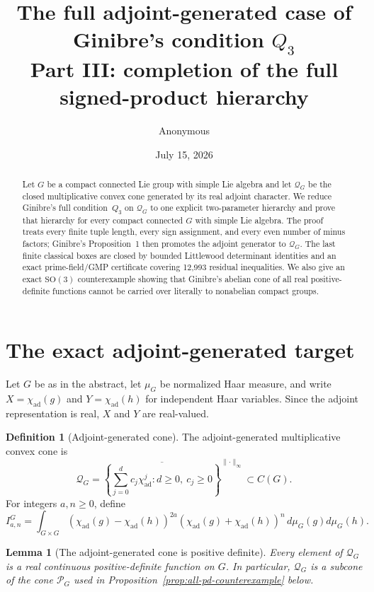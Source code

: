\documentclass[11pt,reqno]{amsart}
\title[Full adjoint-generated Ginibre $Q_3$]{The full adjoint-generated case of Ginibre's condition \texorpdfstring{$Q_3$}{Q3}\\
\large Part III: completion of the full signed-product hierarchy}
\author{Anonymous}
\date{July 15, 2026}
\theoremstyle{plain}
\newtheorem{lemma}[theorem]{Lemma}
\theoremstyle{definition}
\newtheorem{definition}[theorem]{Definition}
\newcommand{\chiad}{\chi_{\mathrm{ad}}}
\newcommand{\Qcone}{\mathcal Q}
\begin{document}
\begin{abstract}
Let $G$ be a compact connected Lie group with simple Lie algebra and let
$\Qcone_G$ be the closed multiplicative convex cone generated by its real
adjoint character.  We reduce Ginibre's full condition~$Q_3$ on $\Qcone_G$
to one explicit two-parameter hierarchy and prove that hierarchy for every
compact connected $G$ with simple Lie algebra.  The proof treats every finite
tuple length, every sign assignment, and every even number of minus factors;
Ginibre's Proposition~1 then promotes the adjoint generator to $\Qcone_G$.
The last finite classical boxes are closed by bounded Littlewood determinant
identities and an exact prime-field/GMP certificate covering 12,993 residual
inequalities.  We also give an exact $\mathrm{SO}(3)$ counterexample showing
that Ginibre's abelian cone of all real positive-definite functions cannot be
carried over literally to nonabelian compact groups.
\end{abstract}

\maketitle

\section{The exact adjoint-generated target}

Let $G$ be as in the abstract, let $\mu_G$ be normalized Haar measure, and
write $X=\chiad(g)$ and $Y=\chiad(h)$ for independent Haar variables.  Since
the adjoint representation is real, $X$ and $Y$ are real-valued.

\begin{definition}[Adjoint-generated cone]
The adjoint-generated multiplicative convex cone is
\[
 \Qcone_G=
 \overline{\left\{
   \sum_{j=0}^{d}c_j\chiad^j:
   d\geq0,\ c_j\geq0
 \right\}}^{\lVert\cdot\rVert_\infty}
 \subset C(G).
\]
For integers $a,n\geq0$, define
\[
 I^G_{a,n}
 =\int_{G\times G}
   (\chiad(g)-\chiad(h))^{2a}
   (\chiad(g)+\chiad(h))^n\,d\mu_G(g)d\mu_G(h).
\]
\end{definition}

\begin{lemma}[The adjoint-generated cone is positive definite]
\label{lem:adjoint-cone-positive-definite}
Every element of $\Qcone_G$ is a real continuous positive-definite function
on $G$.  In particular, $\Qcone_G$ is a subcone of the cone $\mathcal P_G$
used in Proposition~\ref{prop:all-pd-counterexample} below.
\end{lemma}
\end{document}
